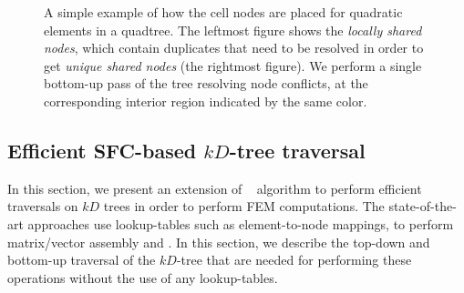 \begin{figure}[H]
		\caption{A simple example of how the cell nodes are placed for quadratic elements in a quadtree. The leftmost figure shows the \textit{locally shared nodes}, which contain duplicates that need to be resolved in order to get \textit{unique shared nodes} (the rightmost figure). We perform a single bottom-up pass of the tree resolving node conflicts, at the corresponding interior region indicated by the same color. 
		\label{fig:cgnodes}}
\end{figure}

\subsection{Efficient SFC-based $kD$-tree traversal}
\label{subsec:treetraverse}
In this section, we present an extension of \tsort~ algorithm to perform efficient traversals on $kD$ trees in order to perform FEM computations. The state-of-the-art approaches\cite{Dendro, mantle, BADER2005994, SundarSampathBiros08} use lookup-tables such as element-to-node mappings, to perform matrix/vector assembly and \mvec. 
In this section, we describe the top-down and bottom-up traversal of the $kD$-tree that are needed for performing these operations without the use of any lookup-tables.

